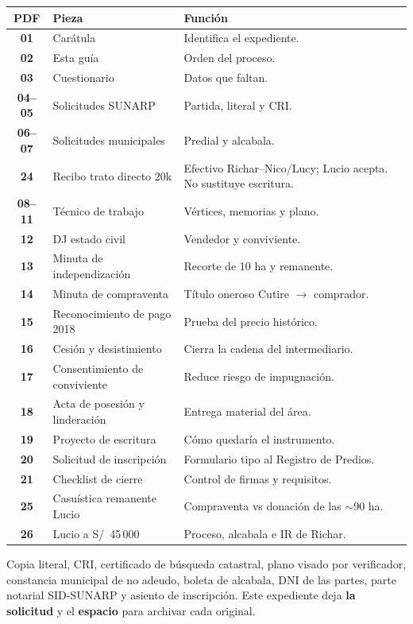 \documentclass[12pt,a4paper]{article}
\begin{document}
{\small\renewcommand{\arraystretch}{1.18}
\noindent\begin{tabularx}{\textwidth}{>{\bfseries}c >{\raggedright\arraybackslash}p{4.6cm} X}
\toprule
PDF & Pieza & Función \\
\midrule
01 & Carátula & Identifica el expediente. \\
02 & Esta guía & Orden del proceso. \\
03 & Cuestionario & Datos que faltan. \\
04--05 & Solicitudes SUNARP & Partida, literal y CRI. \\
06--07 & Solicitudes municipales & Predial y alcabala. \\
24 & Recibo trato directo 20k & Efectivo Richar--Nico/Lucy; Lucio acepta. No sustituye escritura. \\
08--11 & Técnico de trabajo & Vértices, memorias y plano. \\
12 & DJ estado civil & Vendedor y conviviente. \\
13 & Minuta de independización & Recorte de 10 ha y remanente. \\
14 & Minuta de compraventa & Título oneroso Cutire $\rightarrow$ comprador. \\
15 & Reconocimiento de pago 2018 & Prueba del precio histórico. \\
16 & Cesión y desistimiento & Cierra la cadena del intermediario. \\
17 & Consentimiento de conviviente & Reduce riesgo de impugnación. \\
18 & Acta de posesión y linderación & Entrega material del área. \\
19 & Proyecto de escritura & Cómo quedaría el instrumento. \\
20 & Solicitud de inscripción & Formulario tipo al Registro de Predios. \\
21 & Checklist de cierre & Control de firmas y requisitos. \\
25 & Casuística remanente Lucio & Compraventa vs donación de las $\sim$90 ha. \\
26 & Lucio a S/\ 45\,000 & Proceso, alcabala e IR de Richar. \\
\bottomrule
\end{tabularx}}

Copia literal, CRI, certificado de búsqueda catastral, plano visado por verificador, constancia municipal de no adeudo, boleta de alcabala, DNI de las partes, parte notarial SID-SUNARP y asiento de inscripción. Este expediente deja \textbf{la solicitud} y el \textbf{espacio} para archivar cada original.
\end{document}
